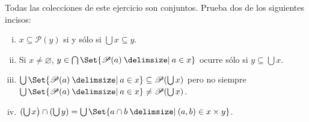 \documentclass[10pt]{article}
\providecommand\given{}
\newcommand\SetSymbol[1][]{%
    \nonscript\:#1\vert
    \allowbreak
    \nonscript\:
    \mathopen{}}
\renewcommand\given{\SetSymbol[\delimsize]}
\newcommand{\ms}[1]{\mathscr{#1}}
\renewcommand{\emptyset}{\varnothing}
\begin{document}
    \begin{exercise}
        Todas las colecciones de este ejercicio son conjuntos. Prueba dos de los siguientes incisos:
        \begin{enumerate}[i)]
            \item \(x \subseteq \ms{P}(y)\) si y sólo si \(\bigcup x \subseteq y\).
            \item Si \(x \neq \emptyset\), \(y \in \bigcap\Set{\ms{P}(a) \given a \in x}\) ocurre sólo si \(y \subseteq \bigcup x\).
            \item \( \bigcup \Set{ \ms{P}(a) \given a \in x } \subseteq \ms{P}(\bigcup x) \) pero no siempre \( \bigcup \Set{ \ms{P}(a) \given a \in x } \neq \ms{P}(\bigcup x) \).
            \item \( ( \bigcup x \big) \cap ( \bigcup y ) = \bigcup \Set{ a \cap b \given (a,b) \in x \times y } \).
        \end{enumerate}
    \end{exercise}
\end{document}
